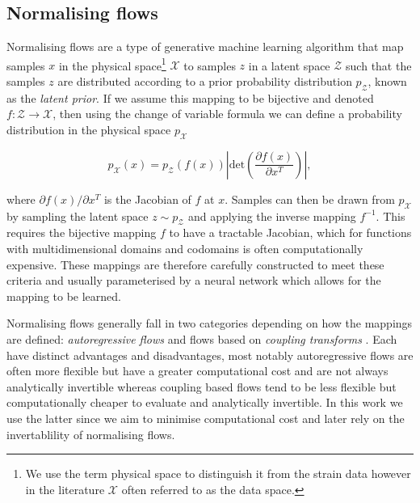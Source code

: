 \documentclass[%
 reprint,
nofootinbib,
 amsmath,amssymb,
 aps,
 prd,
]{revtex4-2}
\newcommand{\latent}{\mathcal{Z}}
\newcommand{\physical}{\mathcal{X}}
\begin{document}
\subsection{Normalising flows}

Normalising flows \cite{Rezende:2015} are a type of generative machine learning algorithm that map samples $x$ in the physical space\footnote{We use the term physical space to distinguish it from the strain data however in the literature $\physical$ often referred to as the data space.} $\physical$ to samples $z$ in a latent space $\latent$ such that the samples $z$ are distributed according to a prior probability distribution $p_{\latent}$, known as the \textit{latent prior}. If we assume this mapping to be bijective and denoted $f: \latent \to \physical$, then using the change of variable formula we can define a probability distribution in the physical space $p_{\physical}$

\begin{equation}\label{eq:change_of_variable}
    p_{\physical}(x) = p_{\latent}(f(x)) \left| \textrm{det} \left( \frac{\partial f(x)}{\partial x^{T}}\right)\right|,
\end{equation}

where $\partial f(x) / \partial x^{T}$ is the Jacobian of $f$ at $x$. Samples can then be drawn from $p_{\physical}$ by sampling the latent space $z \sim p_{\latent}$ and applying the inverse mapping $f^{-1}$. This requires the bijective mapping $f$ to have a tractable Jacobian, which for functions with multidimensional domains and codomains is often computationally expensive. These mappings are therefore carefully constructed to meet these criteria and usually parameterised by a neural network which allows for the mapping to be learned.

Normalising flows generally fall in two categories depending on how the mappings are defined: \textit{autoregressive flows} \cite{Papamakarios:2017made,Huang:2018naf} and flows based on \textit{coupling transforms} \cite{Dinh:2016:rnvp,Kingma:2018glow,Durkan:2019spl}. Each have distinct advantages and disadvantages, most notably autoregressive flows are often more flexible but have a greater computational cost and are not always analytically invertible whereas coupling based flows tend to be less flexible but computationally cheaper to evaluate and analytically invertible. In this work we use the latter since we aim to minimise computational cost and later rely on the invertablility of normalising flows.
\end{document}
